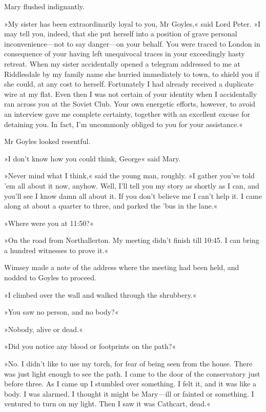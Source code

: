 Mary flushed indignantly.

»My sister has been extraordinarily loyal to you, Mr Goyles,« said Lord Peter. »I may tell you, indeed, that she put herself into a position of grave personal inconvenience—not to say danger—on your behalf. You were traced to London in consequence of your having left unequivocal traces in your exceedingly hasty retreat. When my sister accidentally opened a telegram addressed to me at Riddlesdale by my family name she hurried immediately to town, to shield you if she could, at any cost to herself. Fortunately I had already received a duplicate wire at my flat. Even then I was not certain of your identity when I accidentally ran across you at the Soviet Club. Your own energetic efforts, however, to avoid an interview gave me complete certainty, together with an excellent excuse for detaining you. In fact, I'm uncommonly obliged to you for your assistance.«

Mr Goyles looked resentful.

»I don't know how you could think, George\longdash« said Mary.

»Never mind what I think,« said the young man, roughly. »I gather you've told 'em all about it now, anyhow. Well, I'll tell you my story as shortly as I can, and you'll see I know damn all about it. If you don't believe me I can't help it. I came along at about a quarter to three, and parked the 'bus in the lane.«

»Where were you at 11:50?«

»On the road from Northallerton. My meeting didn't finish till 10:45. I can bring a hundred witnesses to prove it.«

Wimsey made a note of the address where the meeting had been held, and nodded to Goyles to proceed.

»I climbed over the wall and walked through the shrubbery.«

»You saw no person, and no body?«

»Nobody, alive or dead.«

»Did you notice any blood or footprints on the path?«

»No. I didn't like to use my torch, for fear of being seen from the house. There was just light enough to see the path. I came to the door of the conservatory just before three. As I came up I stumbled over something. I felt it, and it was like a body. I was alarmed. I thought it might be Mary—ill or fainted or something. I ventured to turn on my light. Then I saw it was Cathcart, dead.«


